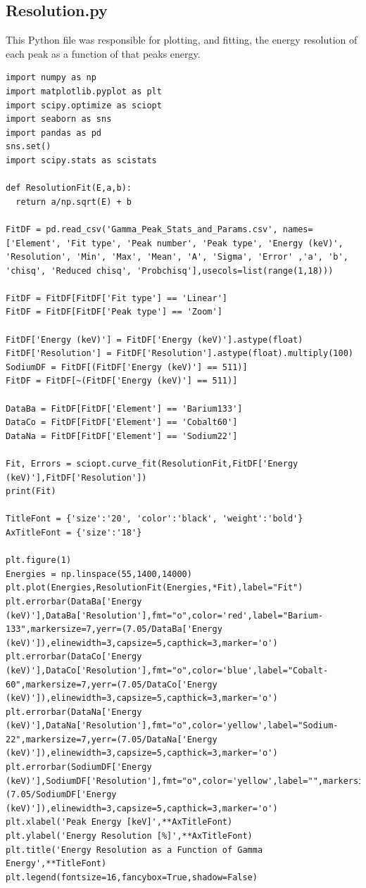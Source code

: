 \documentclass[11pt,a4paper]{article}
\begin{document}
\subsection{Resolution.py}

This Python file was responsible for plotting, and fitting, the energy resolution of each peak as a function of that peaks energy. 

\begin{verbatim}
import numpy as np
import matplotlib.pyplot as plt
import scipy.optimize as sciopt
import seaborn as sns
import pandas as pd
sns.set()
import scipy.stats as scistats

def ResolutionFit(E,a,b):
  return a/np.sqrt(E) + b

FitDF = pd.read_csv('Gamma_Peak_Stats_and_Params.csv', names=['Element', 'Fit type', 'Peak number',	'Peak type', 'Energy (keV)', 'Resolution', 'Min', 'Max', 'Mean', 'A', 'Sigma', 'Error' ,'a', 'b', 'chisq', 'Reduced chisq', 'Probchisq'],usecols=list(range(1,18)))

FitDF = FitDF[FitDF['Fit type'] == 'Linear']
FitDF = FitDF[FitDF['Peak type'] == 'Zoom']

FitDF['Energy (keV)'] = FitDF['Energy (keV)'].astype(float)
FitDF['Resolution'] = FitDF['Resolution'].astype(float).multiply(100)
SodiumDF = FitDF[(FitDF['Energy (keV)'] == 511)]
FitDF = FitDF[~(FitDF['Energy (keV)'] == 511)]

DataBa = FitDF[FitDF['Element'] == 'Barium133']
DataCo = FitDF[FitDF['Element'] == 'Cobalt60']
DataNa = FitDF[FitDF['Element'] == 'Sodium22']

Fit, Errors = sciopt.curve_fit(ResolutionFit,FitDF['Energy (keV)'],FitDF['Resolution'])
print(Fit)

TitleFont = {'size':'20', 'color':'black', 'weight':'bold'} 
AxTitleFont = {'size':'18'}

plt.figure(1)
Energies = np.linspace(55,1400,14000)
plt.plot(Energies,ResolutionFit(Energies,*Fit),label="Fit")
plt.errorbar(DataBa['Energy (keV)'],DataBa['Resolution'],fmt="o",color='red',label="Barium-133",markersize=7,yerr=(7.05/DataBa['Energy (keV)']),elinewidth=3,capsize=5,capthick=3,marker='o')
plt.errorbar(DataCo['Energy (keV)'],DataCo['Resolution'],fmt="o",color='blue',label="Cobalt-60",markersize=7,yerr=(7.05/DataCo['Energy (keV)']),elinewidth=3,capsize=5,capthick=3,marker='o')
plt.errorbar(DataNa['Energy (keV)'],DataNa['Resolution'],fmt="o",color='yellow',label="Sodium-22",markersize=7,yerr=(7.05/DataNa['Energy (keV)']),elinewidth=3,capsize=5,capthick=3,marker='o')
plt.errorbar(SodiumDF['Energy (keV)'],SodiumDF['Resolution'],fmt="o",color='yellow',label="",markersize=7,yerr=(7.05/SodiumDF['Energy (keV)']),elinewidth=3,capsize=5,capthick=3,marker='o')
plt.xlabel('Peak Energy [keV]',**AxTitleFont)
plt.ylabel('Energy Resolution [%]',**AxTitleFont)
plt.title('Energy Resolution as a Function of Gamma Energy',**TitleFont)
plt.legend(fontsize=16,fancybox=True,shadow=False)


\end{verbatim}
\end{document}
